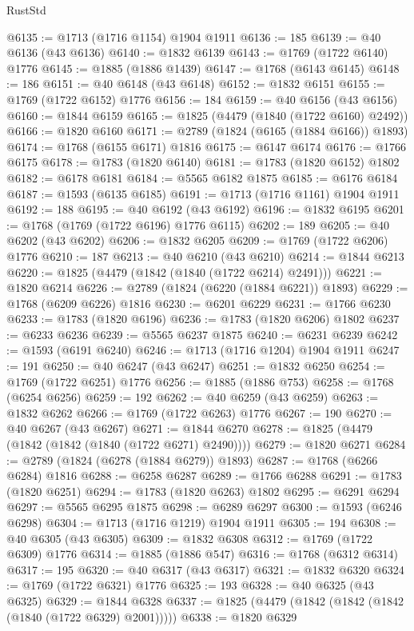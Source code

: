 \begin{lexlean}{RustStd}
\begin{coremodule}
@6135 := @1713 (@1716 @1154) @1904 @1911
@6136 := 185
@6139 := @40 @6136 (@43 @6136)
@6140 := @1832 @6139
@6143 := @1769 (@1722 @6140) @1776
@6145 := @1885 (@1886 @1439)
@6147 := @1768 (@6143 @6145)
@6148 := 186
@6151 := @40 @6148 (@43 @6148)
@6152 := @1832 @6151
@6155 := @1769 (@1722 @6152) @1776
@6156 := 184
@6159 := @40 @6156 (@43 @6156)
@6160 := @1844 @6159
@6165 := @1825 (@4479 (@1840 (@1722 @6160) @2492))
@6166 := @1820 @6160
@6171 := @2789 (@1824 (@6165 (@1884 @6166)) @1893)
@6174 := @1768 (@6155 @6171) @1816
@6175 := @6147 @6174
@6176 := @1766 @6175
@6178 := @1783 (@1820 @6140)
@6181 := @1783 (@1820 @6152) @1802
@6182 := @6178 @6181
@6184 := @5565 @6182 @1875
@6185 := @6176 @6184
@6187 := @1593 (@6135 @6185)
@6191 := @1713 (@1716 @1161) @1904 @1911
@6192 := 188
@6195 := @40 @6192 (@43 @6192)
@6196 := @1832 @6195
@6201 := @1768 (@1769 (@1722 @6196) @1776 @6115)
@6202 := 189
@6205 := @40 @6202 (@43 @6202)
@6206 := @1832 @6205
@6209 := @1769 (@1722 @6206) @1776
@6210 := 187
@6213 := @40 @6210 (@43 @6210)
@6214 := @1844 @6213
@6220 := @1825 (@4479 (@1842 (@1840 (@1722 @6214) @2491)))
@6221 := @1820 @6214
@6226 := @2789 (@1824 (@6220 (@1884 @6221)) @1893)
@6229 := @1768 (@6209 @6226) @1816
@6230 := @6201 @6229
@6231 := @1766 @6230
@6233 := @1783 (@1820 @6196)
@6236 := @1783 (@1820 @6206) @1802
@6237 := @6233 @6236
@6239 := @5565 @6237 @1875
@6240 := @6231 @6239
@6242 := @1593 (@6191 @6240)
@6246 := @1713 (@1716 @1204) @1904 @1911
@6247 := 191
@6250 := @40 @6247 (@43 @6247)
@6251 := @1832 @6250
@6254 := @1769 (@1722 @6251) @1776
@6256 := @1885 (@1886 @753)
@6258 := @1768 (@6254 @6256)
@6259 := 192
@6262 := @40 @6259 (@43 @6259)
@6263 := @1832 @6262
@6266 := @1769 (@1722 @6263) @1776
@6267 := 190
@6270 := @40 @6267 (@43 @6267)
@6271 := @1844 @6270
@6278 := @1825 (@4479 (@1842 (@1842 (@1840 (@1722 @6271) @2490))))
@6279 := @1820 @6271
@6284 := @2789 (@1824 (@6278 (@1884 @6279)) @1893)
@6287 := @1768 (@6266 @6284) @1816
@6288 := @6258 @6287
@6289 := @1766 @6288
@6291 := @1783 (@1820 @6251)
@6294 := @1783 (@1820 @6263) @1802
@6295 := @6291 @6294
@6297 := @5565 @6295 @1875
@6298 := @6289 @6297
@6300 := @1593 (@6246 @6298)
@6304 := @1713 (@1716 @1219) @1904 @1911
@6305 := 194
@6308 := @40 @6305 (@43 @6305)
@6309 := @1832 @6308
@6312 := @1769 (@1722 @6309) @1776
@6314 := @1885 (@1886 @547)
@6316 := @1768 (@6312 @6314)
@6317 := 195
@6320 := @40 @6317 (@43 @6317)
@6321 := @1832 @6320
@6324 := @1769 (@1722 @6321) @1776
@6325 := 193
@6328 := @40 @6325 (@43 @6325)
@6329 := @1844 @6328
@6337 := @1825 (@4479 (@1842 (@1842 (@1842 (@1840 (@1722 @6329) @2001)))))
@6338 := @1820 @6329

\end{coremodule}
\end{lexlean}
